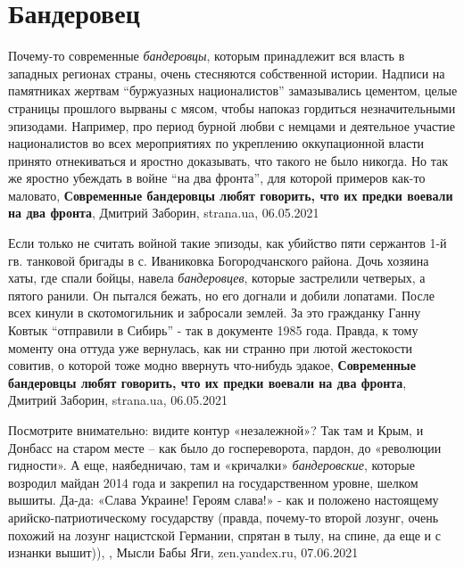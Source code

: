  
 
 
 
 
\chapter{Бандеровец}
\label{sec:slova.banderovec}

Почему-то современные \emph{бандеровцы}, которым принадлежит вся власть в западных
регионах страны, очень стесняются собственной истории. Надписи на памятниках
жертвам \enquote{буржуазных националистов} замазывались цементом, целые страницы
прошлого вырваны с мясом, чтобы напоказ гордиться незначительными эпизодами.
Например, про период бурной любви с немцами и деятельное участие националистов
во всех мероприятиях по укреплению оккупационной власти принято отнекиваться и
яростно доказывать, что такого не было никогда. Но так же яростно убеждать в
войне \enquote{на два фронта}, для которой примеров как-то маловато,
\textbf{Современные бандеровцы любят говорить, что их предки воевали на два фронта},
Дмитрий Заборин, strana.ua, 06.05.2021

Если только не считать войной такие эпизоды, как убийство пяти сержантов 1-й
гв. танковой бригады в с. Иваниковка Богородчанского района. Дочь хозяина хаты,
где спали бойцы, навела \emph{бандеровцев}, которые застрелили четверых, а пятого
ранили. Он пытался бежать, но его догнали и добили лопатами. После всех кинули
в скотомогильник и забросали землей.  За это гражданку Ганну Ковтык
\enquote{отправили в Сибирь} - так в документе 1985 года. Правда, к тому
моменту она оттуда уже вернулась, как ни странно при лютой жестокости совитив,
о которой тоже модно ввернуть что-нибудь эдакое,
\textbf{Современные бандеровцы любят говорить, что их предки воевали на два фронта},
Дмитрий Заборин, strana.ua, 06.05.2021

Посмотрите внимательно: видите контур «незалежной»? Так там и Крым, и Донбасс
на старом месте – как было до госпереворота, пардон, до «революции гидности». А
еще, наябедничаю, там и «кричалки» \emph{бандеровские}, которые возродил майдан
2014 года и закрепил на государственном уровне, шелком вышиты. Да-да: «Слава
Украине! Героям слава!» - как и положено настоящему арийско-патриотическому
государству (правда, почему-то второй лозунг, очень похожий на лозунг
нацистской Германии, спрятан в тылу, на спине, да еще и с изнанки вышит)),
, Мысли Бабы Яги, zen.yandex.ru, 07.06.2021

